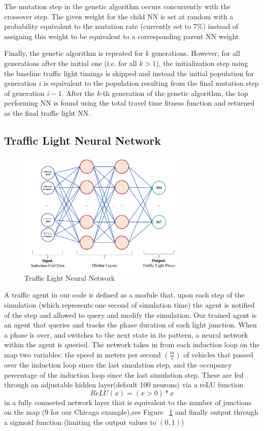 \documentclass[twocolumn]{article}
\begin{document}
The mutation step in the genetic algorithm occurs concurrently with the crossover step. The given weight for the child NN is set at random with a probability equivalent to the mutation rate (currently set to 7\%) instead of assigning this weight to be equivalent to a corresponding parent NN weight.

Finally, the genetic algorithm is repeated for $k$ generations. However, for all generations after the initial one (i.e. for all $k > 1$), the initialization step using the baseline traffic light timings is skipped and instead the initial population for generation $i$ is equivalent to the population resulting from the final mutation step of generation $i-1$. After the $k$-th generation of the genetic algorithm, the top performing NN is found using the total travel time fitness function and returned as the final traffic light NN.

\subsection{Traffic Light Neural Network} \label{NN_subsection}

\begin{figure}[htp]
    \centering
    \includegraphics[width=8cm]{figures/NN_overview.PNG}
    \caption{Traffic Light Neural Network}
    \label{fig:nn_overview}
\end{figure}

A traffic agent in our code is defined as a module that, upon each step of the simulation (which represents one second of simulation time) the agent is notified of the step and allowed to query and modify the simulation. Our trained agent is an agent that queries and tracks the phase duration of each light junction. When a phase is over, and switches to the next state in its pattern, a neural network within the agent is queried. The network takes in from each induction loop on the map two variables: the speed in meters per second $(\frac{m}{s})$ of vehicles that passed over the induction loop since the last simulation step, and the occupancy percentage of the induction loop since the last simulation step. These are fed through an adjustable hidden layer(default 100 neurons)  via a reLU function 
\begin{equation} 
    ReLU(x) = (x > 0) * x
\end{equation}
in a fully connected network  layer that is equivalent to the number of junctions on the map (9 for our Chicago example),see Figure ~\ref{fig:nn_overview} and finally output through a sigmoid function (limiting the output values to $(0,1)$)
\end{document}
